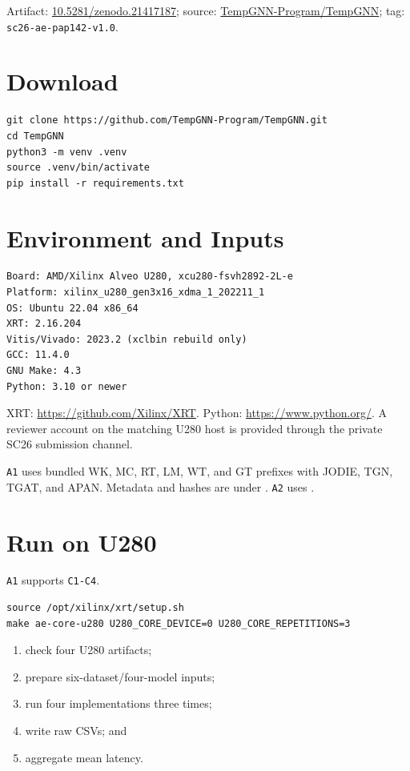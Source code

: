 \documentclass[conference]{IEEEtran}
\begin{document}
\noindent Artifact:
\href{https://doi.org/10.5281/zenodo.21417187}{10.5281/zenodo.21417187};
source:
\href{https://github.com/TempGNN-Program/TempGNN}{TempGNN-Program/TempGNN};
tag: \texttt{sc26-ae-pap142-v1.0}.

\section{Download}
\begin{Verbatim}[fontsize=\small,breaklines=true,breakanywhere=true]
git clone https://github.com/TempGNN-Program/TempGNN.git
cd TempGNN
python3 -m venv .venv
source .venv/bin/activate
pip install -r requirements.txt
\end{Verbatim}

\section{Environment and Inputs}
\begin{Verbatim}[fontsize=\small,breaklines=true,breakanywhere=true]
Board: AMD/Xilinx Alveo U280, xcu280-fsvh2892-2L-e
Platform: xilinx_u280_gen3x16_xdma_1_202211_1
OS: Ubuntu 22.04 x86_64
XRT: 2.16.204
Vitis/Vivado: 2023.2 (xclbin rebuild only)
GCC: 11.4.0
GNU Make: 4.3
Python: 3.10 or newer
\end{Verbatim}

XRT: \url{https://github.com/Xilinx/XRT}. Python:
\url{https://www.python.org/}. A reviewer account on the matching U280 host is
provided through the private SC26 submission channel.

\texttt{A1} uses bundled WK, MC, RT, LM, WT, and GT prefixes with JODIE, TGN,
TGAT, and APAN. Metadata and hashes are under
. \texttt{A2} uses
.

\section{Run on U280}
\texttt{A1} supports \texttt{C1-C4}.
\begin{Verbatim}[fontsize=\small,breaklines=true,breakanywhere=true]
source /opt/xilinx/xrt/setup.sh
make ae-core-u280 U280_CORE_DEVICE=0 U280_CORE_REPETITIONS=3
\end{Verbatim}
\begin{enumerate}
\item check four U280 artifacts;
\item prepare six-dataset/four-model inputs;
\item run four implementations three times;
\item write raw CSVs; and
\item aggregate mean latency.
\end{enumerate}
\end{document}
